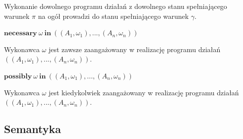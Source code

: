 \documentclass[11pt,a4paper]{article}
\begin{document}
    Wykonanie dowolnego programu działań z dowolnego stanu spełniającego warunek $\pi$ na ogół prowadzi do stanu spełniającego warunek $\gamma$.
    
    \begin{center}
        $\mathbf{necessary}~\omega~\mathbf{in}~((A_1, \omega_1),...,(A_n,\omega_n))$
    \end{center}
    
    Wykonawca $\omega$ jest zawsze zaangażowany w realizację programu działań $((A_1, \omega_1),...,(A_n,\omega_n))$.
    
    \begin{center}
        $\mathbf{possibly}~\omega~\mathbf{in}~((A_1, \omega_1),...,(A_n,\omega_n))$
    \end{center}
    
    Wykonawca $\omega$ jest kiedykolwiek zaangażowany w realizację programu działań $((A_1, \omega_1),...,(A_n,\omega_n))$.    
    
    \subsection{Semantyka}
    
\end{document}
